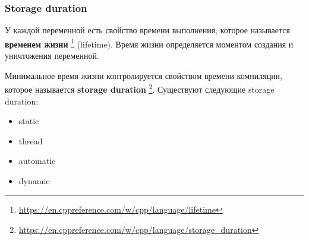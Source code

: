 \documentclass[compress, 8pt, aspectratio=169]{beamer}
\begin{document}
\begin{frame}[fragile]

    \frametitle{Storage duration}

    У каждой переменной есть свойство времени выполнения, которое называется
    \textbf{временем жизни}
    \footnote{\url{https://en.cppreference.com/w/cpp/language/lifetime}} (lifetime).
    Время жизни определяется моментом создания и уничтожения переменной.

    \hfill \break
    Минимальное время жизни контролируется свойством времени компиляции,
    которое называется \textbf{storage duration}
    \footnote{\url{https://en.cppreference.com/w/cpp/language/storage\_duration}}.
    Существуют следующие storage duration:

    \begin{itemize}
        \item static
        \item thread
        \item automatic
        \item dynamic
    \end{itemize}

\end{frame}
\end{document}
